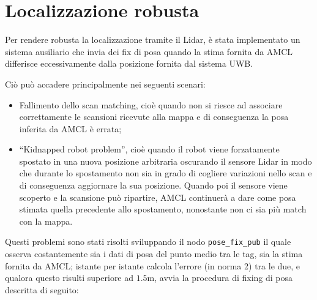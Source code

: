 \section{Localizzazione robusta}
\label{localizzazione_robusta}

Per rendere robusta la localizzazione tramite il Lidar, è stata implementato un sistema ausiliario che invia dei fix di posa quando la stima fornita da AMCL differisce eccessivamente dalla posizione fornita dal sistema UWB. 

Ciò può accadere principalmente nei seguenti scenari:

\begin{itemize}
    \item Fallimento dello scan matching, cioè quando non si riesce ad associare correttamente le scansioni ricevute alla mappa e di conseguenza la posa inferita da AMCL è errata;

    \item “Kidnapped robot problem”, cioè quando il robot viene forzatamente spostato in una nuova posizione arbitraria oscurando il sensore Lidar in modo che durante lo spostamento non sia in grado di cogliere variazioni nello scan e di conseguenza aggiornare la sua posizione. Quando poi il sensore viene scoperto e la scansione può ripartire, AMCL continuerà a dare come posa stimata quella precedente allo spostamento, nonostante non ci sia più match con la mappa.
\end{itemize}

Questi problemi sono stati risolti sviluppando il nodo \verb!pose_fix_pub! il quale osserva costantemente sia i dati di posa del punto medio tra le tag, sia la stima fornita da AMCL; istante per istante calcola l’errore (in norma 2) tra le due, e qualora questo risulti superiore ad $1.5$m, avvia la procedura di fixing di posa descritta di seguito: 

